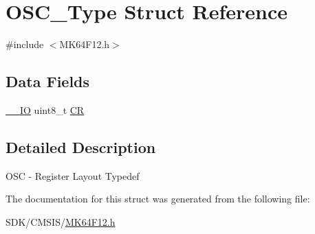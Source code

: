 \hypertarget{struct_o_s_c___type}{}\section{O\+S\+C\+\_\+\+Type Struct Reference}
\label{struct_o_s_c___type}


{\ttfamily \#include $<$M\+K64\+F12.\+h$>$}

\subsection*{Data Fields}
\begin{DoxyCompactItemize}
\item 
\mbox{\hyperlink{core__cm4_8h_aec43007d9998a0a0e01faede4133d6be}{\+\_\+\+\_\+\+IO}} uint8\+\_\+t \mbox{\hyperlink{group___v_r_e_f___peripheral___access___layer_gaa8badb87f4f3dc685e151d16014db8f0}{CR}}
\end{DoxyCompactItemize}


\subsection{Detailed Description}
O\+SC -\/ Register Layout Typedef 

The documentation for this struct was generated from the following file\+:\begin{DoxyCompactItemize}
\item 
S\+D\+K/\+C\+M\+S\+I\+S/\mbox{\hyperlink{_m_k64_f12_8h}{M\+K64\+F12.\+h}}\end{DoxyCompactItemize}
